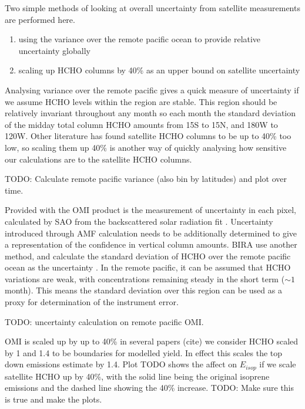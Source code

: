     
    Two simple methods of looking at overall uncertainty from satellite measurements are performed here.
    \begin{enumerate}
      \item using the variance over the remote pacific ocean to provide relative uncertainty globally \parencite[e.g.][]{DeSmedt2012}
      \item scaling up HCHO columns by 40\% as an upper bound on satellite uncertainty
    \end{enumerate}
    Analysing variance over the remote pacific gives a quick measure of uncertainty if we assume HCHO levels within the region are stable.
    This region should be relatively invariant throughout any month so each month the standard deviation of the midday total column HCHO amounts from 15\degr S to 15\degr N, and 180\degr W to 120\degr W.
    Other literature has found satellite HCHO columns to be up to 40\% too low, so scaling them up 40\% is another way of quickly analysing how sensitive our calculations are to the satellite HCHO columns.
    
    TODO: Calculate remote pacific variance (also bin by latitudes) and plot over time. 
    
    
    Provided with the OMI product is the measurement of uncertainty in each pixel, calculated by SAO from the backscattered solar radiation fit \parencite{Abad2015,Abad2016}.
    Uncertainty introduced through AMF calculation needs to be additionally determined to give a representation of the confidence in vertical column amounts.
    BIRA use another method, and calculate the standard deviation of HCHO over the remote pacific ocean as the uncertainty \parencite{DeSmedt2012, DeSmedt2015}.
    In the remote pacific, it can be assumed that HCHO variations are weak, with concentrations remaining steady in the short term ($\sim 1$ month).
    This means the standard deviation over this region can be used as a proxy for determination of the instrument error.
    
    
    TODO: uncertainty calculation on remote pacific OMI.
    
    OMI is scaled up by up to 40\% in several papers (cite) we consider HCHO scaled by 1 and 1.4 to be boundaries for modelled yield.
    In effect this scales the top down emissions estimate by 1.4.
    Plot TODO shows the affect on $E_{isop}$ if we scale satellite HCHO up by 40\%, with the solid line being the original isoprene emissions and the dashed line showing the 40\% increase. TODO: Make sure this is true and make the plots.
    

